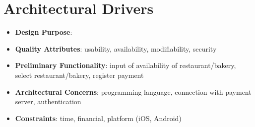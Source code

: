 \documentclass[pdftex, a4paper]{scrartcl}
\begin{document}
\section{Architectural Drivers}

\begin{itemize}
    \item \textbf{Design Purpose}:
    \item \textbf{Quality Attributes}: usability, availability, modifiability, security
    \item \textbf{Preliminary Functionality}: input of availability of restaurant/bakery, select restaurant/bakery, 
    register payment
    \item \textbf{Architectural Concerns}: programming language, connection with payment server, authentication
    \item \textbf{Constraints}: time, financial, platform (iOS, Android)
\end{itemize}
\end{document}
